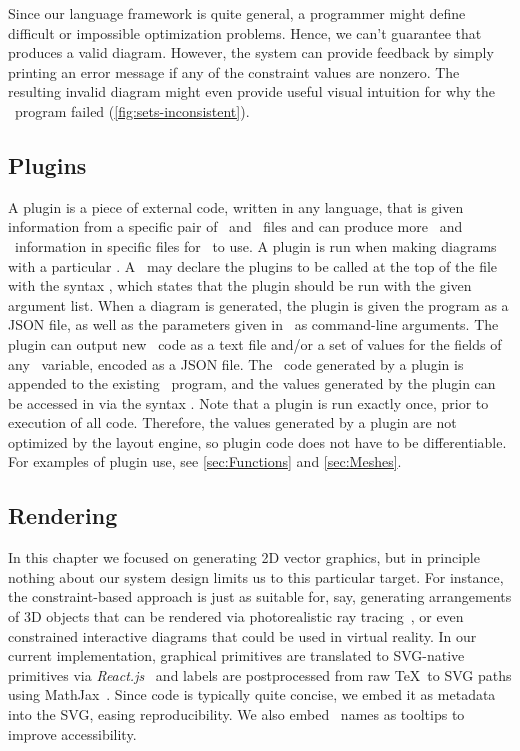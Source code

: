 Since our language framework is quite general, a programmer might define difficult or impossible optimization problems.  Hence, we can't guarantee that \Penrose{} produces a valid diagram.  However, the system can provide feedback by simply printing an error message if any of the constraint values are nonzero.  The resulting invalid diagram might even provide useful visual intuition for why the \Style\ program failed (\cref{fig:sets-inconsistent}).

\subsection{Plugins}
\label{sec:PlugIns}

A plugin is a piece of external code, written in any language, that is given information from a specific pair of \Substance\ and \Style\ files and can produce more \Substance\ and \Style\ information in specific files for \Penrose\ to use. A plugin is run when making diagrams with a particular \Style. A \Style\ may declare the plugins to be called at the top of the file with the syntax \mbox{,} which states that the plugin  should be run with the given argument list. When a diagram is generated, the plugin is given the \Substance{} program as a JSON file, as well as the parameters given in \Style\ as command-line arguments. The plugin can output new \Substance\ code as a text file and/or a set of values for the fields of any \Substance\ variable, encoded as a JSON file. The \Substance\ code generated by a plugin is appended to the existing \Substance\ program, and the values generated by the plugin can be accessed in \Style{} via the syntax . Note that a plugin is run exactly once, prior to execution of all \Penrose{} code. Therefore, the values generated by a plugin are not optimized by the layout engine, so plugin code does not have to be differentiable. For examples of plugin use, see \cref{sec:Functions} and \cref{sec:Meshes}.


\subsection{Rendering}
\label{sec:Rendering}

In this chapter we focused on generating 2D vector graphics, but in principle nothing about our system design limits us to this particular target.  For instance, the constraint-based approach is just as suitable for, say, generating arrangements of 3D objects that can be rendered via photorealistic ray tracing~\cite{Pharr:2016:PBR}, or even constrained interactive diagrams that could be used in virtual reality.  In our current implementation, graphical primitives are translated to SVG-native primitives via \emph{React.js}~\cite{Facebook:2020:RJS} and labels are postprocessed from raw \TeX\ to SVG paths using MathJax~\cite{Cervone:2012:MJ}.  Since \Penrose{} code is typically quite concise, we embed it as metadata into the SVG, easing reproducibility.  We also embed \Substance\ names as tooltips to improve accessibility.

